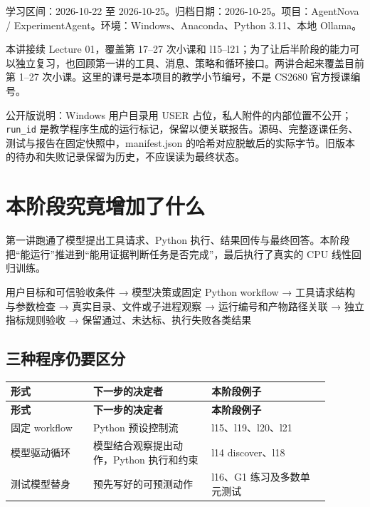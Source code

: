
学习区间：2026-10-22 至 2026-10-25。归档日期：2026-10-25。项目：AgentNova / ExperimentAgent。环境：Windows、Anaconda、Python 3.11、本地 Ollama。

本讲接续 Lecture 01，覆盖第 17–27 次小课和 l15–l21；为了让后半阶段的能力可以独立复习，也回顾第一讲的工具、消息、策略和循环接口。两讲合起来覆盖目前第 1–27 次小课。这里的课号是本项目的教学小节编号，不是 CS2680 官方授课编号。

公开版说明：Windows 用户目录用 USER 占位，私人附件的内部位置不公开；\nolinkurl{run_id} 是教学程序生成的运行标记，保留以便关联报告。源码、完整逐课任务、测试与报告在固定快照中，manifest.json 的哈希对应脱敏后的实际字节。旧版本的待办和失败记录保留为历史，不应误读为最终状态。

\section{本阶段究竟增加了什么}

第一讲跑通了模型提出工具请求、Python 执行、结果回传与最终回答。本阶段把“能运行”推进到“能用证据判断任务是否完成”，最后执行了真实的 CPU 线性回归训练。

\begin{Code}
用户目标和可信验收条件
  → 模型决策或固定 Python workflow
  → 工具请求结构与参数检查
  → 真实目录、文件或子进程观察
  → 运行编号和产物路径关联
  → 独立指标规则验收
  → 保留通过、未达标、执行失败各类结果
\end{Code}

\subsection{三种程序仍要区分}

{\small\setlength{\tabcolsep}{4pt}
\renewcommand{\arraystretch}{1.25}
\begin{longtable}{>{\raggedright\arraybackslash}p{0.23\linewidth}>{\raggedright\arraybackslash}p{0.33\linewidth}>{\raggedright\arraybackslash}p{0.33\linewidth}}
\toprule
\textbf{形式} & \textbf{下一步的决定者} & \textbf{本阶段例子} \\
\midrule\endfirsthead
\toprule
\textbf{形式} & \textbf{下一步的决定者} & \textbf{本阶段例子} \\
\midrule\endhead
\bottomrule\endfoot
固定 workflow & Python 预设控制流 & l15、l19、l20、l21 \\
模型驱动循环 & 模型结合观察提出动作，Python 执行和约束 & l14 discover、l18 \\
测试模型替身 & 预先写好的可预测动作 & l16、G1 练习及多数单元测试 \\
\end{longtable}}

